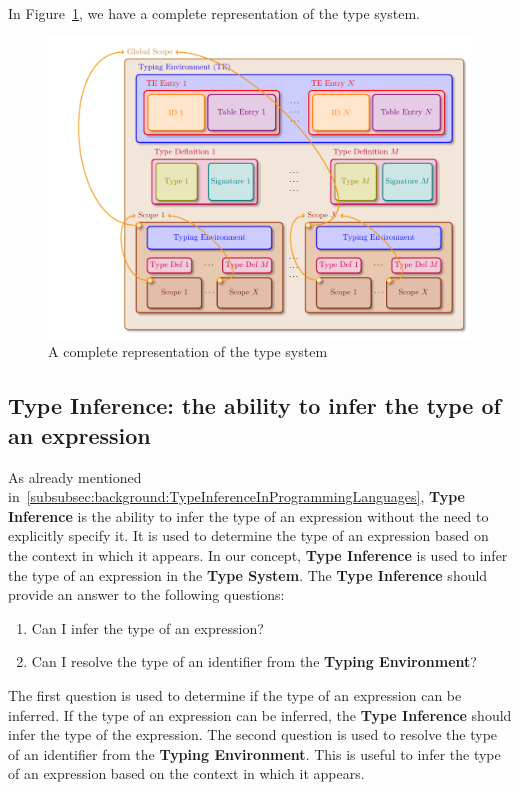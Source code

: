In Figure~\ref{lst:concept:type_system}, we have a complete representation of the type system.

\begin{figure}[tbh]
    \centering
    \includegraphics[width=0.9\linewidth]{figs/concept/type_system.pdf}
    \caption{A complete representation of the type system}
    \label{lst:concept:type_system}
\end{figure}

\subsection{Type Inference: the ability to infer the type of an expression}\label{subsec:concept:TypeInferenceTheAbilityToInferTheTypeOfAnExpression}

As already mentioned in~\ref{subsubsec:background:TypeInferenceInProgrammingLanguages}, \textbf{Type Inference} is the ability to infer the type of an expression without the need to explicitly specify it. It is used to determine the type of an expression based on the context in which it appears.
In our concept, \textbf{Type Inference} is used to infer the type of an expression in the \textbf{Type System}.
The \textbf{Type Inference} should provide an answer to the following questions:
\begin{enumerate}
    \item Can I infer the type of an expression?
    \item Can I resolve the type of an identifier from the \textbf{Typing Environment}?
\end{enumerate}

The first question is used to determine if the type of an expression can be inferred. If the type of an expression can be inferred, the \textbf{Type Inference} should infer the type of the expression. The second question is used to resolve the type of an identifier from the \textbf{Typing Environment}. This is useful to infer the type of an expression based on the context in which it appears.

